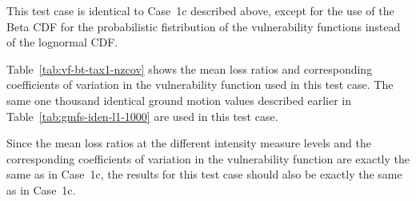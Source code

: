 This test case is identical to Case~1c described above, except for the use of the Beta CDF for the probabilistic fistribution of the vulnerability functions instead of the lognormal CDF.



Table~\ref{tab:vf-bt-tax1-nzcov} shows the mean loss ratios and corresponding coefficients of variation in the vulnerability function used in this test case. The same one thousand identical ground motion values described earlier in Table~\ref{tab:gmfs-iden-l1-1000} are used in this test case.

Since the mean loss ratios at the different intensity measure levels and the corresponding coefficients of variation in the vulnerability function are exactly the same as in Case~1c, the results for this test case should also be exactly the same as in Case~1c.